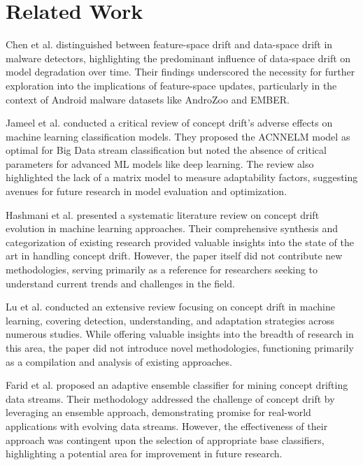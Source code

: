 \section{Related Work}
\label{sec:related}

Chen et al. \cite{chen2023overkill} distinguished between feature-space drift and data-space drift in malware detectors, highlighting the predominant influence of data-space drift on model degradation over time. Their findings underscored the necessity for further exploration into the implications of feature-space updates, particularly in the context of Android malware datasets like AndroZoo and EMBER.

Jameel et al. \cite{jameel2020critical}  conducted a critical review of concept drift's adverse effects on machine learning classification models. They proposed the ACNNELM model as optimal for Big Data stream classification but noted the absence of critical parameters for advanced ML models like deep learning. The review also highlighted the lack of a matrix model to measure adaptability factors, suggesting avenues for future research in model evaluation and optimization.

Hashmani et al. \cite{hashmani2020concept} presented a systematic literature review on concept drift evolution in machine learning approaches. Their comprehensive synthesis and categorization of existing research provided valuable insights into the state of the art in handling concept drift. However, the paper itself did not contribute new methodologies, serving primarily as a reference for researchers seeking to understand current trends and challenges in the field.

Lu et al. \cite{lu2018learning} conducted an extensive review focusing on concept drift in machine learning, covering detection, understanding, and adaptation strategies across numerous studies. While offering valuable insights into the breadth of research in this area, the paper did not introduce novel methodologies, functioning primarily as a compilation and analysis of existing approaches.

Farid et al. \cite{farid2013adaptive} proposed an adaptive ensemble classifier for mining concept drifting data streams. Their methodology addressed the challenge of concept drift by leveraging an ensemble approach, demonstrating promise for real-world applications with evolving data streams. However, the effectiveness of their approach was contingent upon the selection of appropriate base classifiers, highlighting a potential area for improvement in future research.